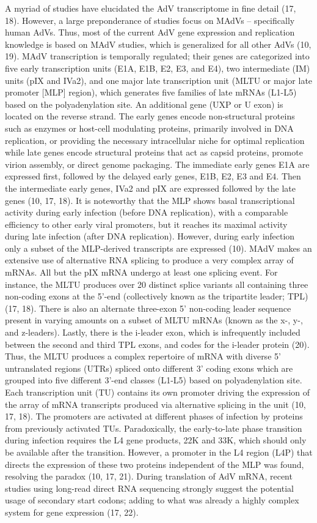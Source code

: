 \documentclass[
]{article}
\begin{document}
A myriad of studies have elucidated the AdV transcriptome in fine detail
(17, 18). However, a large preponderance of studies focus on MAdVs --
specifically human AdVs. Thus, most of the current AdV gene expression
and replication knowledge is based on MAdV studies, which is generalized
for all other AdVs (10, 19). MAdV transcription is temporally regulated;
their genes are categorized into five early transcription units (E1A,
E1B, E2, E3, and E4), two intermediate (IM) units (pIX and IVa2), and
one major late transcription unit (MLTU or major late promoter {[}MLP{]}
region), which generates five families of late mRNAs (L1-L5) based on
the polyadenylation site. An additional gene (UXP or U exon) is located
on the reverse strand. The early genes encode non-structural proteins
such as enzymes or host-cell modulating proteins, primarily involved in
DNA replication, or providing the necessary intracellular niche for
optimal replication while late genes encode structural proteins that act
as capsid proteins, promote virion assembly, or direct genome packaging.
The immediate early genes E1A are expressed first, followed by the
delayed early genes, E1B, E2, E3 and E4. Then the intermediate early
genes, IVa2 and pIX are expressed followed by the late genes (10, 17,
18). It is noteworthy that the MLP shows basal transcriptional activity
during early infection (before DNA replication), with a comparable
efficiency to other early viral promoters, but it reaches its maximal
activity during late infection (after DNA replication). However, during
early infection only a subset of the MLP-derived transcripts are
expressed (10). MAdV makes an extensive use of alternative RNA splicing
to produce a very complex array of mRNAs. All but the pIX mRNA undergo
at least one splicing event. For instance, the MLTU produces over 20
distinct splice variants all containing three non-coding exons at the
5'-end (collectively known as the tripartite leader; TPL) (17, 18).
There is also an alternate three-exon 5' non-coding leader sequence
present in varying amounts on a subset of MLTU mRNAs (known as the x-,
y-, and z-leaders). Lastly, there is the i-leader exon, which is
infrequently included between the second and third TPL exons, and codes
for the i-leader protein (20). Thus, the MLTU produces a complex
repertoire of mRNA with diverse 5' untranslated regions (UTRs) spliced
onto different 3' coding exons which are grouped into five different
3'-end classes (L1-L5) based on polyadenylation site. Each transcription
unit (TU) contains its own promoter driving the expression of the array
of mRNA transcripts produced via alternative splicing in the unit (10,
17, 18). The promoters are activated at different phases of infection by
proteins from previously activated TUs. Paradoxically, the early-to-late
phase transition during infection requires the L4 gene products, 22K and
33K, which should only be available after the transition. However, a
promoter in the L4 region (L4P) that directs the expression of these two
proteins independent of the MLP was found, resolving the paradox (10,
17, 21). During translation of AdV mRNA, recent studies using long-read
direct RNA sequencing strongly suggest the potential usage of secondary
start codons; adding to what was already a highly complex system for
gene expression (17, 22).
\end{document}
